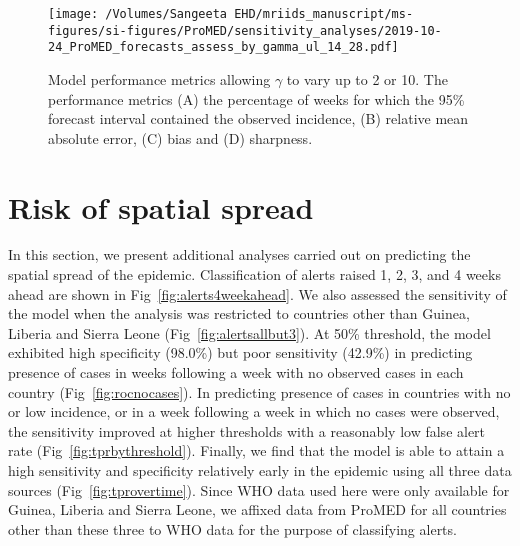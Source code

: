 \documentclass[9pt,twoside,lineno]{pnas-new}
\begin{document}
\begin{figure}
    \centering
    \texttt{[image: /Volumes/Sangeeta EHD/mriids\_manuscript/ms-figures/si-figures/ProMED/sensitivity\_analyses/2019-10-24\_ProMED\_forecasts\_assess\_by\_gamma\_ul\_14\_28.pdf]} 
  \caption{Model performance metrics allowing $\gamma$ to vary up to
    2 or 10. The performance metrics (A) the percentage of weeks for
    which the 95\% forecast interval contained the observed incidence,
    (B) relative mean absolute error, (C) bias and (D) sharpness.}\label{fig:perfbygamma}
\end{figure}\FloatBarrier

\section{Risk of spatial spread}\label{sec:spatial-spread}

In this section, we present additional analyses carried out on
predicting the spatial spread of the epidemic. Classification of
alerts raised 1, 2, 3, and 4 weeks ahead are shown in
Fig~\ref{fig:alerts4weekahead}. We also assessed the sensitivity
of the model when the analysis was restricted to countries other than
Guinea, Liberia and Sierra Leone (Fig~\ref{fig:alertsallbut3}). At
50\% threshold, the
model exhibited high specificity (98.0\%) but poor sensitivity (42.9\%) in predicting 
presence of cases in weeks following a week with no observed cases in each
country (Fig~\ref{fig:rocnocases}). In predicting presence of cases in
countries with no or low incidence, or in a
week following a week in which no cases were observed, the sensitivity
improved at higher thresholds with a reasonably low false alert rate
(Fig~\ref{fig:tprbythreshold}). Finally, we find that the model is
able to attain a high sensitivity and specificity relatively early in 
the epidemic using all three data sources (Fig~\ref{fig:tprovertime}).
Since WHO data used here were only available for Guinea, Liberia and
Sierra Leone, we affixed data from ProMED for all countries other than
these three to WHO data for the purpose of classifying alerts.
 
\end{document}
